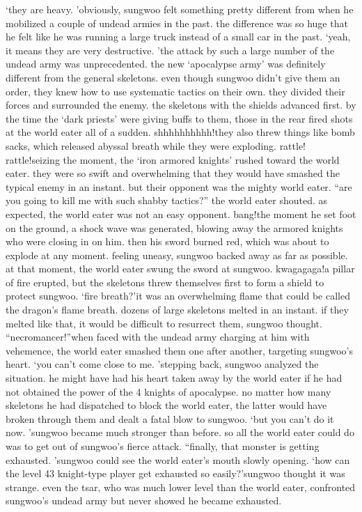 ‘they are heavy.
’obviously, sungwoo felt something pretty different from when he mobilized a couple of undead armies in the past.
 the difference was so huge that he felt like he was running a large truck instead of a small car in the past.
‘yeah, it means they are very destructive.
’the attack by such a large number of the undead army was unprecedented.
the new ‘apocalypse army’ was definitely different from the general skeletons.
 even though sungwoo didn’t give them an order, they knew how to use systematic tactics on their own.
they divided their forces and surrounded the enemy.
 the skeletons with the shields advanced first.
 by the time the ‘dark priests’ were giving buffs to them, those in the rear fired shots at the world eater all of a sudden.
shhhhhhhhhh!they also threw things like bomb sacks, which released abyssal breath while they were exploding.
rattle! rattle!seizing the moment, the ‘iron armored knights’ rushed toward the world eater.
they were so swift and overwhelming that they would have smashed the typical enemy in an instant.
 but their opponent was the mighty world eater.
“are you going to kill me with such shabby tactics?” the world eater shouted.
as expected, the world eater was not an easy opponent.
bang!the moment he set foot on the ground, a shock wave was generated, blowing away the armored knights who were closing in on him.
then his sword burned red, which was about to explode at any moment.
feeling uneasy, sungwoo backed away as far as possible.
at that moment, the world eater swung the sword at sungwoo.
kwagagaga!a pillar of fire erupted, but the skeletons threw themselves first to form a shield to protect sungwoo.
‘fire breath?’it was an overwhelming flame that could be called the dragon’s flame breath.
dozens of large skeletons melted in an instant.
 if they melted like that, it would be difficult to resurrect them, sungwoo thought.
“necromancer!”when faced with the undead army charging at him with vehemence, the world eater smashed them one after another, targeting sungwoo’s heart.
‘you can’t come close to me.
’stepping back, sungwoo analyzed the situation.
 he might have had his heart taken away by the world eater if he had not obtained the power of the 4 knights of apocalypse.
no matter how many skeletons he had dispatched to block the world eater, the latter would have broken through them and dealt a fatal blow to sungwoo.
‘but you can’t do it now.
’sungwoo became much stronger than before.
 so all the world eater could do was to get out of sungwoo’s fierce attack.
“finally, that monster is getting exhausted.
’sungwoo could see the world eater’s mouth slowly opening.
‘how can the level 43 knight-type player get exhausted so easily?’sungwoo thought it was strange.
 even the tsar, who was much lower level than the world eater, confronted sungwoo’s undead army but never showed he became exhausted.


